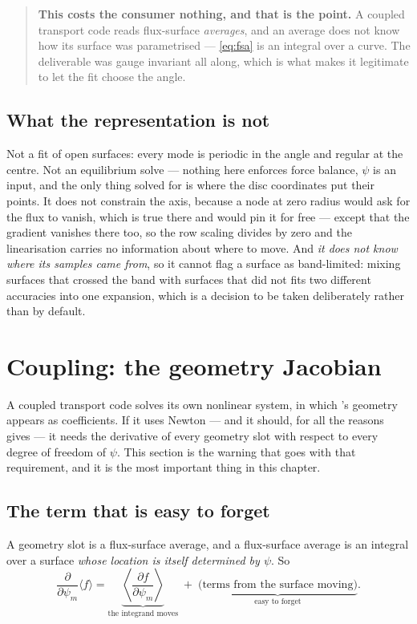 \begin{quote}
	\textbf{This costs the consumer nothing, and that is the point.} A coupled
	transport code reads flux-surface \emph{averages}, and an average does not
	know how its surface was parametrised --- \eqref{eq:fsa} is an integral over
	a curve. The deliverable was gauge invariant all along, which is what makes
	it legitimate to let the fit choose the angle.
\end{quote}

\subsection{What the representation is not}

Not a fit of open surfaces: every mode is periodic in the angle and regular at
the centre. Not an equilibrium solve --- nothing here enforces force balance,
$\psi$ is an input, and the only thing solved for is where the disc coordinates
put their points. It does not constrain the axis, because a node at zero radius
would ask for the flux to vanish, which is true there and would pin it for free
--- except that the gradient vanishes there too, so the row scaling divides by
zero and the linearisation carries no information about where to move. And
\emph{it does not know where its samples came from}, so it cannot flag a surface
as band-limited: mixing surfaces that crossed the band with surfaces that did not
fits two different accuracies into one expansion, which is a decision to be taken
deliberately rather than by default.

\section{Coupling: the geometry Jacobian}
\label{sec:jacobian}

A coupled transport code solves its own nonlinear system, in which {\meq}'s
geometry appears as coefficients. If it uses Newton --- and it should, for all
the reasons  gives --- it needs the derivative of every geometry
slot with respect to every degree of freedom of $\psi$. This section is the
warning that goes with that requirement, and it is the most important thing in
this chapter.

\subsection{The term that is easy to forget}

A geometry slot is a flux-surface average, and a flux-surface average is an
integral over a surface \emph{whose location is itself determined by $\psi$}.
So
\begin{equation}
	\frac{\partial}{\partial \psi_m} \langle f \rangle
		= \underbrace{\left\langle \frac{\partial f}{\partial \psi_m}
			\right\rangle}_{\text{the integrand moves}}
		\; + \; \underbrace{\bigl(\text{terms from the surface moving}
			\bigr)}_{\text{easy to forget}} .
	\label{eq:jacobian}
\end{equation}

